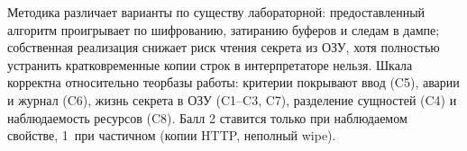 Методика различает варианты по существу лабораторной: предоставленный алгоритм проигрывает по шифрованию, затиранию буферов и следам в дампе; собственная реализация снижает риск чтения секрета из ОЗУ, хотя полностью устранить кратковременные копии строк в интерпретаторе нельзя. Шкала корректна относительно теорбазы работы: критерии покрывают ввод (C5), аварии и журнал (C6), жизнь секрета в ОЗУ (C1--C3, C7), разделение сущностей (C4) и наблюдаемость ресурсов (C8). Балл 2 ставится только при наблюдаемом свойстве, 1~\mdash  при частичном (копии HTTP, неполный wipe).
